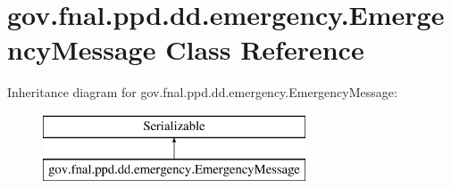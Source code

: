 \hypertarget{classgov_1_1fnal_1_1ppd_1_1dd_1_1emergency_1_1EmergencyMessage}{\section{gov.\-fnal.\-ppd.\-dd.\-emergency.\-Emergency\-Message Class Reference}
\label{classgov_1_1fnal_1_1ppd_1_1dd_1_1emergency_1_1EmergencyMessage}
}
Inheritance diagram for gov.\-fnal.\-ppd.\-dd.\-emergency.\-Emergency\-Message\-:\begin{figure}[H]
\begin{center}
\leavevmode
\includegraphics[height=2.000000cm]{classgov_1_1fnal_1_1ppd_1_1dd_1_1emergency_1_1EmergencyMessage}
\end{center}
\end{figure}
